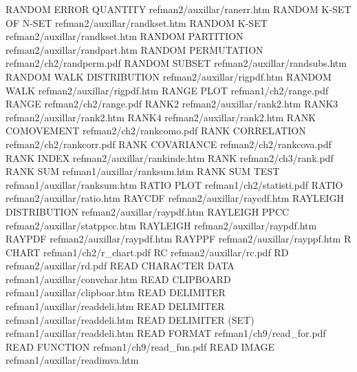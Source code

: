 RANDOM ERROR QUANTITY                   refman2/auxillar/ranerr.htm
RANDOM K-SET OF N-SET                   refman2/auxillar/randkset.htm
RANDOM K-SET                            refman2/auxillar/randkset.htm
RANDOM PARTITION                        refman2/auxillar/randpart.htm
RANDOM PERMUTATION                      refman2/ch2/randperm.pdf
RANDOM SUBSET                           refman2/auxillar/randsubs.htm
RANDOM WALK DISTRIBUTION                refman2/auxillar/rigpdf.htm
RANDOM WALK                             refman2/auxillar/rigpdf.htm
RANGE PLOT                              refman1/ch2/range.pdf
RANGE                                   refman2/ch2/range.pdf
RANK2                                   refman2/auxillar/rank2.htm
RANK3                                   refman2/auxillar/rank2.htm
RANK4                                   refman2/auxillar/rank2.htm
RANK COMOVEMENT                         refman2/ch2/rankcomo.pdf
RANK CORRELATION                        refman2/ch2/rankcorr.pdf
RANK COVARIANCE                         refman2/ch2/rankcova.pdf
RANK INDEX                              refman2/auxillar/rankinde.htm
RANK                                    refman2/ch3/rank.pdf
RANK SUM                                refman1/auxillar/ranksum.htm
RANK SUM TEST                           refman1/auxillar/ranksum.htm
RATIO PLOT                              refman1/ch2/statisti.pdf
RATIO                                   refman2/auxillar/ratio.htm
RAYCDF                                  refman2/auxillar/raycdf.htm
RAYLEIGH DISTRIBUTION                   refman2/auxillar/raypdf.htm
RAYLEIGH PPCC                           refman2/auxillar/statppcc.htm
RAYLEIGH                                refman2/auxillar/raypdf.htm
RAYPDF                                  refman2/auxillar/raypdf.htm
RAYPPF                                  refman2/auxillar/rayppf.htm
R CHART                                 refman1/ch2/r_chart.pdf
RC                                      refman2/auxillar/rc.pdf
RD                                      refman2/auxillar/rd.pdf
READ CHARACTER DATA                     refman1/auxillar/convchar.htm
READ CLIPBOARD                          refman1/auxillar/clipboar.htm
READ DELIMITER                          refman1/auxillar/readdeli.htm
READ DELIMITER                          refman1/auxillar/readdeli.htm
READ DELIMITER (SET)                    refman1/auxillar/readdeli.htm
READ FORMAT                             refman1/ch9/read_for.pdf
READ FUNCTION                           refman1/ch9/read_fun.pdf
READ IMAGE                              refman1/auxillar/readimva.htm
